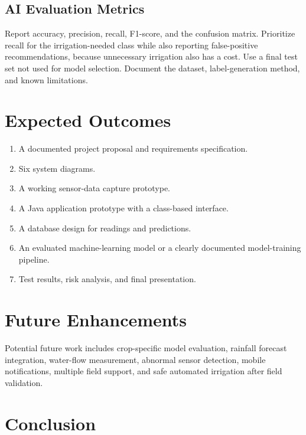 \documentclass[12pt,a4paper]{report}
\begin{document}
\section{AI Evaluation Metrics}

Report accuracy, precision, recall, F1-score, and the confusion matrix. Prioritize recall for the irrigation-needed class while also reporting false-positive recommendations, because unnecessary irrigation also has a cost. Use a final test set not used for model selection. Document the dataset, label-generation method, and known limitations.

\chapter{Expected Outcomes}

\begin{enumerate}[leftmargin=*]

\item A documented project proposal and requirements specification.

\item Six system diagrams.

\item A working sensor-data capture prototype.

\item A Java application prototype with a class-based interface.

\item A database design for readings and predictions.

\item An evaluated machine-learning model or a clearly documented model-training pipeline.

\item Test results, risk analysis, and final presentation.

\end{enumerate}

\chapter{Future Enhancements}

Potential future work includes crop-specific model evaluation, rainfall forecast integration, water-flow measurement, abnormal sensor detection, mobile notifications, multiple field support, and safe automated irrigation after field validation.

\chapter{Conclusion}
\end{document}
